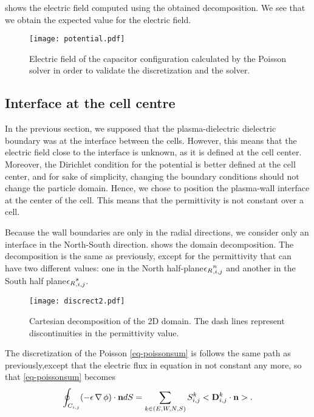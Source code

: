      shows the electric field computed using the obtained decomposition.
    We see that we obtain the expected value for the electric field.

    \begin{figure}[hbtp]
      \centering
      \texttt{[image: potential.pdf]}
      \caption{Electric field of the capacitor configuration calculated by the Poisson solver in order to validate the discretization and the solver. }
      \label{fig-surface}
    \end{figure}


  \subsection{Interface at the cell centre}
    In the previous section, we supposed that the plasma-dielectric dielectric boundary was at the interface between the cells.
    However, this means that the electric field close to the interface is unknown, as it is defined at the cell center.
    Moreover, the Dirichlet condition for the potential is better defined at the cell center, and for sake of simplicity, changing the boundary conditions should not change the particle domain.
    Hence, we chose to position the plasma-wall interface at the center of the cell.
    This means that the permittivity is not constant over a cell.

    Because the wall boundaries are only in the radial directions, we consider only an interface in the North-South direction.
     shows the domain decomposition.
    The decomposition is the same as previously, except for the permittivity that can have two different values\string: one in the North half-plane${\epsilon_{R}}_{, i,j}^n$ and another in the South half plane${\epsilon_{R}}_{, i,j}^s$.

    \begin{figure}[hbt]
      \centering
      \texttt{[image: discrect2.pdf]}
      \caption{Cartesian decomposition of the \ac{2D} domain. The dash lines represent discontinuities in the permittivity value.}
      \label{fig-decompo2}
    \end{figure}

    The discretization of the Poisson \cref{eq-poissonsum} is follows the same path as previously,except that the electric flux in equation in not constant any more, so that \cref{eq-poissonsum} becomes
    \begin{equation}
    \oint_{C_{i,j}} (-\epsilon \operatorname{{\mathbf \nabla}} \phi) \cdot {\mathbf n} dS = \sum_{k\in(E,W,N,S)} S^k_{i,j} <{\mathbf D}^k_{i,j} \cdot {\mathbf n}>.
    \end{equation}

